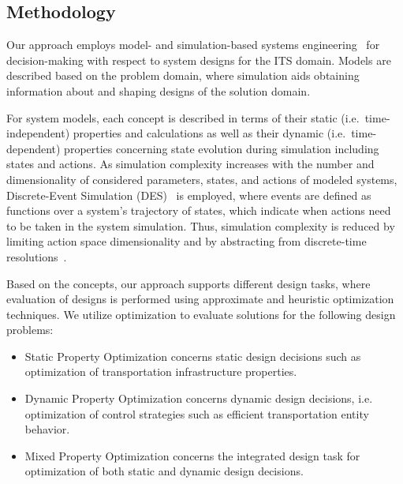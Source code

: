 \documentclass[10pt,twocolumn]{article}
\begin{document}


\subsection{Methodology}
\label{sec:methodology}

Our approach employs model- and simulation-based systems engineering~\cite{gianni2014modeling} for decision-making with respect to system designs for the ITS domain. Models are described based on the problem domain, where simulation aids obtaining information about and shaping designs of the solution domain.

For system models, each concept is described in terms of their static (i.e.\ time-independent) properties and calculations as well as their dynamic (i.e.\ time-dependent) properties concerning state evolution during simulation including states and actions. As simulation complexity increases with the number and dimensionality of considered parameters, states, and actions of modeled systems, Discrete-Event Simulation (DES)~\cite{fishman2001discrete} is employed, where events are defined as functions over a system's trajectory of states, which indicate when actions need to be taken in the system simulation. Thus, simulation complexity is reduced by limiting action space dimensionality and by abstracting from discrete-time resolutions~\cite{ascher2023discrete}.


Based on the concepts, our approach supports different design tasks, where evaluation of designs is performed using approximate and heuristic optimization techniques. We utilize optimization to evaluate solutions for the following design problems:

\begin{itemize}
\item Static Property Optimization concerns static design decisions such as optimization of transportation infrastructure properties.
\item Dynamic Property Optimization concerns dynamic design decisions, i.e. optimization of control strategies such as efficient transportation entity behavior.
\item Mixed Property Optimization concerns the integrated design task for optimization of both static and dynamic design decisions.
\end{itemize}
\end{document}
